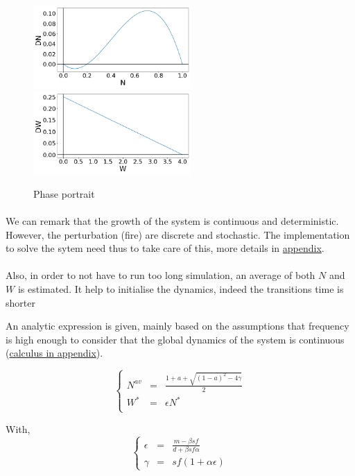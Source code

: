 \documentclass{article}
\begin{document}
\begin{figure}[h!]
\centering
\includegraphics[width=6cm]{phase_N.png}
\includegraphics[width=6cm]{phase_W.png}
\caption{Phase portrait}
\end{figure}

\paragraph{}
We can remark that the growth of the system is continuous and deterministic. However, the perturbation (fire) are discrete and stochastic. The implementation to solve the sytem need thus to take care of this, more details in \hyperref[technicality]{appendix}.




\paragraph{}
\label{average_estimation}
Also, in order to not have to run too long simulation, an average of both $N$ and $W$ is estimated. It help to initialise the dynamics, indeed the transitions time is shorter

An analytic expression is given, mainly based on the assumptions that frequency is high enough to consider that the global dynamics of the system is continuous (\hyperref[average]{calculus in appendix}).


\[
\left\lbrace
\begin{array}{rcl}
N^{av} & = & \frac{1+a+\sqrt{(1-a)^2-4\gamma}}{2} \\
W^* & = & \epsilon N^* \\
\end{array}
\right.
\]

With,
\[
\left\lbrace
\begin{array}{rcl}
\epsilon & = & \frac{m-\beta s f}{d + \beta s f \alpha} \\
\gamma & = & sf(1+\alpha\epsilon)
\end{array}
\right.
\]
\end{document}
